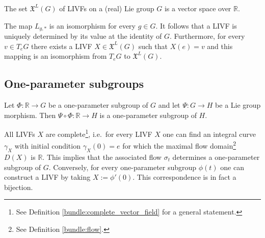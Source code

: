     \begin{property}
        The set $\mathfrak{X}^L(G)$ of LIVFs on a (real) Lie group $G$ is a vector space over $\mathbb{R}$.
    \end{property}
    \begin{property}\label{lie:livf_prop}
        The map $L_{g,\ast}$ is an isomorphism for every $g\in G$. It follows that a LIVF is uniquely determined by its value at the identity of $G$. Furthermore, for every $v\in T_eG$ there exists a LIVF $X\in\mathfrak{X}^L(G)$ such that $X(e)=v$ and this mapping is an isomorphism from $T_eG$ to $\mathfrak{X}^L(G)$.
    \end{property}

\subsection{One-parameter subgroups}

    \begin{property}\label{lie:OPS_composition}
        Let $\Phi:\mathbb{R}\rightarrow G$ be a one-parameter subgroup of $G$ and let $\Psi:G\rightarrow H$ be a Lie group morphism. Then $\Psi\circ\Phi:\mathbb{R}\rightarrow H$ is a one-parameter subgroup of $H$.
    \end{property}

    \begin{property}\label{lie:livf_subgroup}
        All LIVFs $X$ are complete\footnote{See Definition \ref{bundle:complete_vector_field} for a general statement.}, i.e.~for every LIVF $X$ one can find an integral curve $\gamma_X$ with initial condition $\gamma_X(0) = e$ for which the maximal flow domain\footnote{See Definition \ref{bundle:flow}.} $D(X)$ is $\mathbb{R}$. This implies that the associated flow $\sigma_t$ determines a one-parameter subgroup of $G$. Conversely, for every one-parameter subgroup $\phi(t)$ one can construct a LIVF by taking $X := \phi'(0)$. This correspondence is in fact a bijection.
    \end{property}

